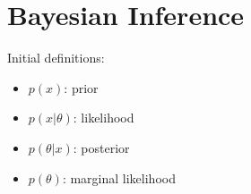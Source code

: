 
\chapter{Bayesian Inference}
\minitoc

\citep{Gelman2013}

Initial definitions:
\begin{itemize}
    \item $p(x)$: prior
    \item $p(x|\theta)$: likelihood
    \item $p(\theta|x)$: posterior
    \item $p(\theta)$: marginal likelihood
\end{itemize}

\clearpage
\printbibliography[segment=\therefsegment,heading=subbibintoc]